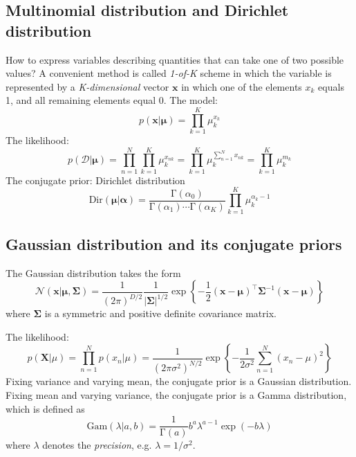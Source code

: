 \documentclass[a4paper]{report}
\newcommand{\up}{\mathrm}
\renewcommand{\bf}{\mathbf}
\renewcommand{\cal}{\mathcal}
\newcommand{\imp}[1]{{\color{blue}\textit{#1}}}
\begin{document}
\subsection{Multinomial distribution and Dirichlet distribution}
How to express variables describing quantities that can take one of two possible values? A convenient method is called \imp{1-of-K} scheme in which the variable is represented by a \emph{K-dimensional} vector $\bf{x}$ in which one of the elements $x_k$ equals 1, and all remaining elements equal 0.
The model:
\begin{equation}
	p(\bf{x}|\boldsymbol\mu)=\prod_{k=1}^{K}\mu_{k}^{x_k}
\end{equation}
The likelihood:
\begin{equation}
	p(\cal{D}|\boldsymbol\mu)=\prod_{n=1}^{N}\prod_{k=1}^{K}\mu_k^{x_{nk}}=\prod_{k=1}^{K}\mu_{k}^{\sum_{n=1}^{N}x_{nk}}=\prod_{k=1}^{K}\mu_{k}^{m_k}
\end{equation}
The conjugate prior: Dirichlet distribution
\begin{equation}
	\up{Dir}(\boldsymbol\mu|\boldsymbol\alpha)=\frac{\up{\Gamma}(\alpha_0)}{\up{\Gamma}(\alpha_1)\cdots\up{\Gamma}(\alpha_K)}\prod_{k=1}^{K}\mu_{k}^{\alpha_k-1}
\end{equation}
\subsection{Gaussian distribution and its conjugate priors}
The Gaussian distribution takes the form
\begin{equation}
	\cal{N}(\bf{x}|\boldsymbol{\mu,\Sigma})=\frac{1}{(2\pi)^{D/2}}\frac{1}{|\boldsymbol{\Sigma}|^{1/2}}\exp\left\lbrace-\frac{1}{2}(\bf{x}-\boldsymbol{\mu})^{\intercal}\boldsymbol{\Sigma}^{-1}(\bf{x}-\boldsymbol{\mu}) \right\rbrace 
\end{equation}
where $\boldsymbol{\Sigma}$ is a symmetric and positive definite covariance matrix. 

The likelihood:
\begin{equation}
	p(\bf{X}|\mu)=\prod_{n=1}^{N}p(x_n|\mu)=\frac{1}{(2\pi \sigma^2)^{N/2}}\exp\left\lbrace-\frac{1}{2\sigma^2}\sum_{n=1}^{N}(x_n-\mu)^2\right\rbrace
\end{equation}
Fixing variance and varying mean, the conjugate prior is a Gaussian distribution. Fixing mean and varying variance, the conjugate prior is a Gamma distribution, which is defined as
\begin{equation}
	\up{Gam}(\lambda|a,b)=\frac{1}{\up{\Gamma}(a)}b^a \lambda^{a-1}\exp(-b\lambda)
\end{equation}
where $\lambda$ denotes the \emph{precision}, e.g. $\lambda = 1/\sigma^2$.
\end{document}
